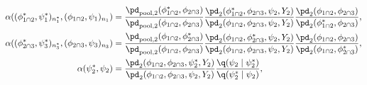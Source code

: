 \begin{align}
  \alpha((\phi_{1 \cap 2}^{*}, \psi_{1}^{*})_{n_{1}^{*}}, (\phi_{1 \cap 2}, \psi_{1})_{n_{1}}) &=
    \frac {
      \pd_{\text{pool}, 2}(\phi_{1 \cap 2}^{*}, \phi_{2 \cap 3})
    } {
      \pd_{\text{pool}, 2}(\phi_{1 \cap 2}, \phi_{2 \cap 3})
    }
    \frac {
      \pd_{2}(\phi_{1 \cap 2}^{*}, \phi_{2 \cap 3}, \psi_{2}, Y_{2})
    } {
      \pd_{2}(\phi_{1 \cap 2}, \phi_{2 \cap 3}, \psi_{2}, Y_{2})
    }
    \frac {
      \pd_{2} (\phi_{1 \cap 2}, \phi_{2 \cap 3})
    } {
      \pd_{2} (\phi_{1 \cap 2}^{*}, \phi_{2 \cap 3})
    },
  \\
  \alpha((\phi_{2 \cap 3}^{*}, \psi_{3}^{*})_{n_{3}^{*}}, (\phi_{2 \cap 3}, \psi_{3})_{n_{3}}) &=
    \frac {
      \pd_{\text{pool}, 2}(\phi_{1 \cap 2}, \phi_{2 \cap 3}^{*})
    } {
      \pd_{\text{pool}, 2}(\phi_{1 \cap 2}, \phi_{2 \cap 3})
    }
    \frac {
      \pd_{2}(\phi_{1 \cap 2}, \phi_{2 \cap 3}^{*}, \psi_{2}, Y_{2})
    } {
      \pd_{2}(\phi_{1 \cap 2}, \phi_{2 \cap 3}, \psi_{2}, Y_{2})
    }
    \frac {
      \pd_{2} (\phi_{1 \cap 2}, \phi_{2 \cap 3})
    } {
      \pd_{2} (\phi_{1 \cap 2}, \phi_{2 \cap 3}^{*})
    },
  \\
  \alpha(\psi_{2}^{*}, \psi_{2}) &=
    \frac {
      \pd_{2}(\phi_{1 \cap 2}, \phi_{2 \cap 3}, \psi_{2}^{*}, Y_{2})
    } {
      \pd_{2}(\phi_{1 \cap 2}, \phi_{2 \cap 3}, \psi_{2}, Y_{2})
    }
    \frac {
      \q(\psi_{2} \mid \psi_{2}^{*})
    } {
      \q(\psi_{2}^{*} \mid \psi_{2})
    },
  \label{eqn:stage-two-acceptance}
\end{align}